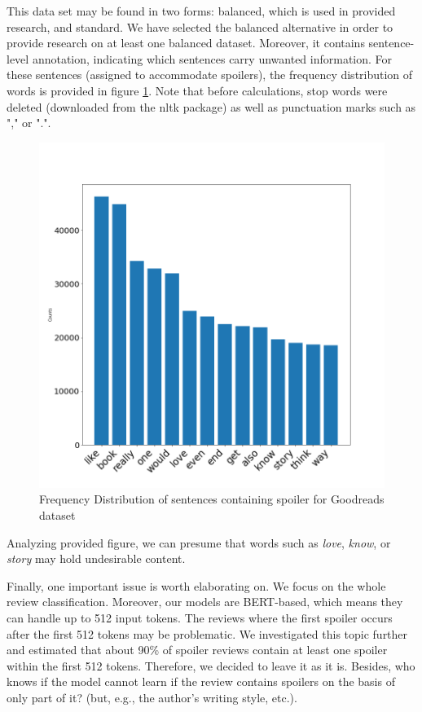 \documentclass[11pt]{article}
\begin{document}
This data set may be found in two forms: balanced, which is used in provided research, and standard. We have selected the balanced alternative in order to provide research on at least one balanced dataset.
Moreover, it contains sentence-level annotation, indicating which sentences carry unwanted information. For these sentences (assigned to accommodate spoilers), the frequency distribution of words is provided in figure \ref{fig:freq-dist}. Note that before calculations, stop words were deleted (downloaded from the nltk package) as well as punctuation marks such as "," or ".".

\begin{figure}[h]
    \centering
    \includegraphics[width=\columnwidth]{img/FreqDistFiqure.png}
    \caption{Frequency Distribution of sentences containing spoiler for Goodreads dataset} 
    \label{fig:freq-dist}
\end{figure}

Analyzing provided figure, we can presume that words such as \emph{love}, \emph{know}, or \emph{story} may hold undesirable content.

Finally, one important issue is worth elaborating on. We focus on the whole review classification. Moreover, our models are BERT-based, which means they can handle up to 512 input tokens. The reviews where the first spoiler occurs after the first 512 tokens may be problematic. We investigated this topic further and estimated that about 90\% of spoiler reviews contain at least one spoiler within the first 512 tokens. Therefore, we decided to leave it as it is. Besides, who knows if the model cannot learn if the review contains spoilers on the basis of only part of it? (but, e.g., the author's writing style, etc.).
\end{document}
